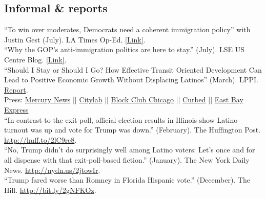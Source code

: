 \documentclass[11pt, a4paper]{article}
\newcommand{\years}[1]{\marginnote{\scriptsize #1}}
\begin{document}
\subsection*{Informal \& reports}
\years{2018} ``To win over moderates, Democrats need a coherent immigration policy'' with Justin Gest (July). LA Times Op-Ed. \href{http://www.latimes.com/opinion/op-ed/la-oe-gest-reny-immigration-policy-democrats-20180720-story.html}{[Link]}.\\
\years{} ``Why the GOP’s anti-immigration politics are here to stay.'' (July). LSE US Centre Blog. \href{http://blogs.lse.ac.uk/usappblog/2018/07/09/why-the-gops-anti-immigration-politics-are-here-to-stay/}{[Link]}.\\
\years{} ``Should I Stay or Should I Go? How Effective Transit Oriented Development Can Lead to Positive Economic Growth Without Displacing Latinos'' (March). LPPI. \href{http://latino.ucla.edu/}{Report}.\\
\indent Press: 
\indent \href{https://www.mercurynews.com/2018/03/29/development-without-gentrification-oaklands-fruitvale-is-the-model-report-says/}{Mercury News} || 
\indent \href{https://www.citylab.com/equity/2018/04/how-transit-oriented-development-can-prevent-displacement/556373/?utm_source=twb%3Futm_source%3Dfbb}{Citylab} || \indent \href{https://blockclubchicago.org/2018/11/12/can-chicagos-gentrifying-neighborhoods-grow-without-leaving-longtime-residents-behind-oaklands-fruitvale-village-offers-hope/}{Block Club Chicago} ||
\indent \href{https://sf.curbed.com/2018/4/4/17198326/oakland-fruitvale-transit-village-housing-displacement-gentrification}{Curbed} || 
\indent \href{https://www.eastbayexpress.com/SevenDays/archives/2018/04/02/mondays-briefing-ucla-study-says-fruitvale-village-is-a-model-for-urban-planning-stephon-clark-protestor-struck-by-sacramento-sheriffs-veh}{East Bay Express}\\
\years{2017} ``In contrast to the exit poll, official election results in Illinois show Latino turnout was up and vote for Trump was down.'' (February). The Huffington Post. \href{http://huff.to/2lC9rc8}{http://huff.to/2lC9rc8}.\\
\years{} ``No, Trump didn't do surprisingly well among Latino voters: Let's once and for all dispense with that exit-poll-based fiction.'' (January). The New York Daily News. \href{http://nydn.us/2jtowIr}{http://nydn.us/2jtowIr}.\\
\years{2016} ``Trump fared worse than Romney in Florida Hispanic vote.'' (December). The Hill. \href{http://bit.ly/2gNFKOz}{http://bit.ly/2gNFKOz}.\\
\end{document}
